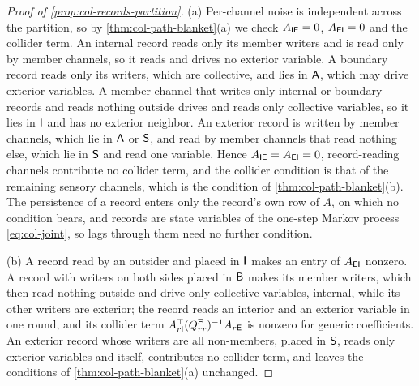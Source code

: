 \begin{proof}[Proof of \cref{prop:col-records-partition}]
(a) Per-channel noise is independent across the partition, so by \cref{thm:col-path-blanket}(a) we check $A_{\mathsf{I}\mathsf{E}}=0$, $A_{\mathsf{E}\mathsf{I}}=0$ and the collider term. An internal record reads only its member writers and is read only by member channels, so it reads and drives no exterior variable. A boundary record reads only its writers, which are collective, and lies in $\mathsf{A}$, which may drive exterior variables. A member channel that writes only internal or boundary records and reads nothing outside drives and reads only collective variables, so it lies in $\mathsf{I}$ and has no exterior neighbor. An exterior record is written by member channels, which lie in $\mathsf{A}$ or $\mathsf{S}$, and read by member channels that read nothing else, which lie in $\mathsf{S}$ and read one variable. Hence $A_{\mathsf{I}\mathsf{E}}=A_{\mathsf{E}\mathsf{I}}=0$, record-reading channels contribute no collider term, and the collider condition is that of the remaining sensory channels, which is the condition of \cref{thm:col-path-blanket}(b). The persistence of a record enters only the record's own row of $A$, on which no condition bears, and records are state variables of the one-step Markov process \eqref{eq:col-joint}, so lags through them need no further condition.

(b) A record read by an outsider and placed in $\mathsf{I}$ makes an entry of $A_{\mathsf{E}\mathsf{I}}$ nonzero. A record with writers on both sides placed in $\mathsf{B}$ makes its member writers, which then read nothing outside and drive only collective variables, internal, while its other writers are exterior; the record reads an interior and an exterior variable in one round, and its collider term $A_{r\mathsf{I}}^\top(Q^{\Xi}_{rr})^{-1}A_{r\mathsf{E}}$ is nonzero for generic coefficients. An exterior record whose writers are all non-members, placed in $\mathsf{S}$, reads only exterior variables and itself, contributes no collider term, and leaves the conditions of \cref{thm:col-path-blanket}(a) unchanged.
\end{proof}

